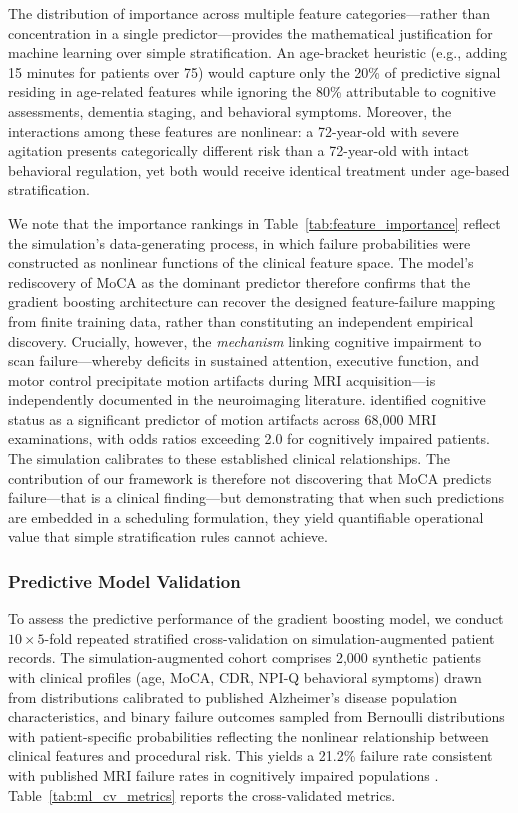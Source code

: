 \documentclass[11pt,a4paper]{article}
\begin{document}
The distribution of importance across multiple feature categories---rather than concentration in a single predictor---provides the mathematical justification for machine learning over simple stratification. An age-bracket heuristic (e.g., adding 15 minutes for patients over 75) would capture only the 20\% of predictive signal residing in age-related features while ignoring the 80\% attributable to cognitive assessments, dementia staging, and behavioral symptoms. Moreover, the interactions among these features are nonlinear: a 72-year-old with severe agitation presents categorically different risk than a 72-year-old with intact behavioral regulation, yet both would receive identical treatment under age-based stratification.

We note that the importance rankings in Table~\ref{tab:feature_importance} reflect the simulation's data-generating process, in which failure probabilities were constructed as nonlinear functions of the clinical feature space. The model's rediscovery of MoCA as the dominant predictor therefore confirms that the gradient boosting architecture can recover the designed feature-failure mapping from finite training data, rather than constituting an independent empirical discovery. Crucially, however, the \textit{mechanism} linking cognitive impairment to scan failure---whereby deficits in sustained attention, executive function, and motor control precipitate motion artifacts during MRI acquisition---is independently documented in the neuroimaging literature. \citet{porembka2025disparities} identified cognitive status as a significant predictor of motion artifacts across 68,000 MRI examinations, with odds ratios exceeding 2.0 for cognitively impaired patients. The simulation calibrates to these established clinical relationships. The contribution of our framework is therefore not discovering that MoCA predicts failure---that is a clinical finding---but demonstrating that when such predictions are embedded in a scheduling formulation, they yield quantifiable operational value that simple stratification rules cannot achieve.

\subsubsection{Predictive Model Validation}

To assess the predictive performance of the gradient boosting model, we conduct $10 \times 5$-fold repeated stratified cross-validation on simulation-augmented patient records. The simulation-augmented cohort comprises 2,000 synthetic patients with clinical profiles (age, MoCA, CDR, NPI-Q behavioral symptoms) drawn from distributions calibrated to published Alzheimer's disease population characteristics, and binary failure outcomes sampled from Bernoulli distributions with patient-specific probabilities reflecting the nonlinear relationship between clinical features and procedural risk. This yields a 21.2\% failure rate consistent with published MRI failure rates in cognitively impaired populations \citep{porembka2025disparities}. Table~\ref{tab:ml_cv_metrics} reports the cross-validated metrics.
\end{document}
